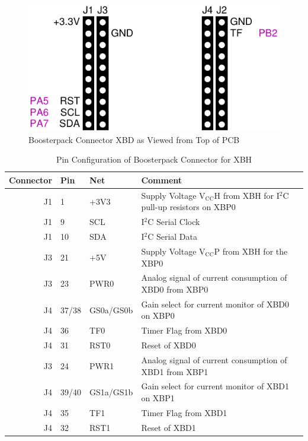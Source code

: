 \documentclass[twoside,11pt]{cergdoc}
\begin{document}
\begin{appendix}
\begin{figure}[ht]
  \begin{center}
    \includegraphics[scale=1]{figures/xbp-xbd}
    \caption{Boosterpack Connector XBD as Viewed from Top of PCB}
  \end{center}
\end{figure}
\begin{table}[ht]
  \begin{center}
    \caption{Pin Configuration of Boosterpack Connector for XBH}
    \begin{tabular}{rlll}
      Connector & Pin  & Net         & Comment  \\ \hline
       J1 & 1  & +3V3      & Supply Voltage $\mathrm{V_{CC}H}$ from XBH for I$^2$C pull-up resistors on XBP0 \\
       J1 & 9  & SCL       & I$^2$C Serial Clock  \\
       J1 & 10 & SDA       & I$^2$C Serial Data \\ 
       J3 & 21 & +5V       & Supply Voltage $\mathrm{V_{CC}P}$ from XBH for the XBP0 \\ \hline

       J3 & 23 & PWR0      & Analog signal of current consumption of XBD0 from XBP0\\
       J4 & 37/38 & GS0a/GS0b & Gain select for current monitor of XBD0 on XBP0\\
       J4 & 36 & TF0       & Timer Flag from XBD0 \\
       J4 & 31 & RST0      & Reset of XBD0 \\ \hline

       J3 & 24 & PWR1      & Analog signal of current consumption of XBD1 from XBP1 \\
       J4 & 39/40 & GS1a/GS1b & Gain select for current monitor of XBD1 on XBP1\\
       J4 & 35 & TF1       & Timer Flag from XBD1 \\
       J4 & 32 & RST1      & Reset of XBD1 \\ \hline


\end{tabular}
\end{center}
\end{table}
\end{appendix}
\end{document}
